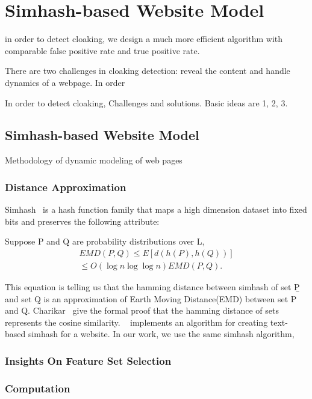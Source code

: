 \section{Simhash-based Website Model}
\label{s:methodology}



in order to detect cloaking, we design a much more efficient algorithm with
comparable false positive rate and true positive rate.

There are two challenges in cloaking detection: reveal the content and handle
dynamics of a webpage.
In order 

In order to detect cloaking,
Challenges and solutions. Basic ideas are 1, 2, 3.




\subsection{Simhash-based Website Model}
Methodology of dynamic modeling of web pages
\subsubsection{Distance Approximation}
Simhash~\cite{charikar2002similarity} is a hash function family that maps a high dimension dataset into fixed
bits and preserves the following attribute:

Suppose P and Q are probability distributions over L, 
\begin{multline}
  EMD(P, Q) \le E[d(h(P), h(Q))] \\
  \le O(\log{n}\log{\log{n}})EMD(P, Q).
\end{multline}

This equation is telling us that the hamming distance between simhash of set
\b{P} and set \b{Q} is an approximation of Earth Moving Distance(EMD) between set P
and Q. Charikar~\cite{charikar2002similarity} give the formal proof that the
hamming distance of sets represents the cosine similarity.
~\cite{manku2007detecting} implements an algorithm for creating text-based
simhash for a website. In our work, we use the same simhash algorithm,


\subsubsection{Insights On Feature Set Selection}



\subsubsection{Computation}


